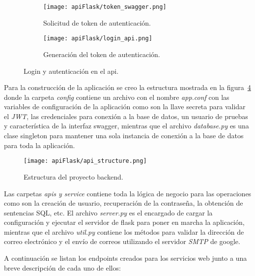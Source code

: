 \begin{figure}[H]
  \begin{subfigure}[b]{0.49\textwidth}
      \texttt{[image: apiFlask/token\_swagger.png]}
      \caption{Solicitud de token de autenticación.}
      \label{img:tokenSwagger}
    \end{subfigure}
    \hfill
    \begin{subfigure}[b]{0.49\textwidth}
      \texttt{[image: apiFlask/login\_api.png]}
      \caption{Generación del token de autenticación.}
      \label{img:loginApi}
    \end{subfigure}
    \caption{Login y autenticación en el api.}
\end{figure}

Para la construcción de la aplicación se creo la estructura mostrada en la figura~\ref{img:apiStructure} donde la carpeta \textit{config} contiene un archivo con el nombre \textit{app.conf} con las variables de configuración de la aplicación como son la llave secreta para validar el \textit{JWT}, las credenciales para conexión a la base de datos, un usuario de pruebas y característica de la interfaz swagger, mientras que el archivo \textit{database.py} es una clase singleton para mantener una sola instancia de conexión a la base de datos para toda la aplicación.

\begin{figure}[H]
  \centering
  \texttt{[image: apiFlask/api\_structure.png]}
  \caption{Estructura del proyecto backend.}
  \label{img:apiStructure}
\end{figure}

Las carpetas \textit{apis y service} contiene toda la lógica de negocio para las operaciones como son la creación de usuario, recuperación de la contraseña, la obtención de sentencias SQL, etc. El archivo \textit{server.py} es el encargado de cargar la configuración y ejecutar el servidor de flask para poner en marcha la aplicación, mientras que el archivo \textit{util.py} contiene los métodos para validar la dirección de correo electrónico y el envío de correos utilizando el servidor \textit{SMTP} de google.

A continuación se listan los endpoints creados para los servicios web junto a una breve descripción de cada uno de ellos:

